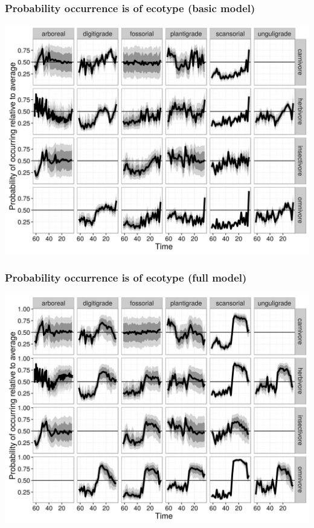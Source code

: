 \documentclass{beamer}
\begin{document}
\begin{frame}
  \frametitle{Probability occurrence is of ecotype (basic model)}
  \begin{center}
    \includegraphics[height=0.8\textheight,width=\textwidth,keepaspectratio=true]{figure/cept_occur_prob_basic}
  \end{center}
\end{frame}

\begin{frame}
  \frametitle{Probability occurrence is of ecotype (full model)}
  \begin{center}
    \includegraphics[height=0.8\textheight,width=\textwidth,keepaspectratio=true]{figure/cept_occur_prob_full}
  \end{center}
\end{frame}
\end{document}
